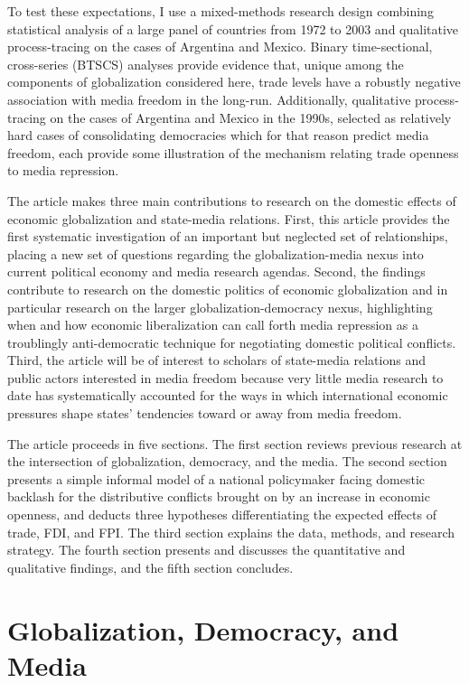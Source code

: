 \documentclass[12pt,a4paper]{article}\usepackage[]{graphicx}\usepackage[]{color}
\begin{document}
To test these expectations, I use a mixed-methods research design combining statistical analysis of a large panel of countries from 1972 to 2003 and qualitative process-tracing on the cases of Argentina and Mexico. Binary time-sectional, cross-series (BTSCS) analyses provide evidence that, unique among the components of globalization considered here, trade levels have a robustly negative association with media freedom in the long-run. Additionally, qualitative process-tracing on the cases of Argentina and Mexico in the 1990s, selected as relatively hard cases of consolidating democracies which for that reason predict media freedom, each provide some illustration of the mechanism relating trade openness to media repression.

The article makes three main contributions to research on the domestic effects of economic globalization and state-media relations. First, this article provides the first systematic investigation of an important but neglected set of relationships, placing a new set of questions regarding the globalization-media nexus into current political economy and media research agendas. Second, the findings contribute to research on the domestic politics of economic globalization and in particular research on the larger globalization-democracy nexus, highlighting when and how economic liberalization can call forth media repression as a troublingly anti-democratic technique for negotiating domestic political conflicts. Third, the article will be of interest to scholars of state-media relations and public actors interested in media freedom because very little media research to date has systematically accounted for the ways in which international economic pressures shape states' tendencies toward or away from media freedom.

The article proceeds in five sections. The first section reviews previous research at the intersection of globalization, democracy, and the media. The second section presents a simple informal model of a national policymaker facing domestic backlash for the distributive conflicts brought on by an increase in economic openness, and deducts three hypotheses differentiating the expected effects of trade, FDI, and FPI. The third section explains the data, methods, and research strategy. The fourth section presents and discusses the quantitative and qualitative findings, and the fifth section concludes.

\section{Globalization, Democracy, and Media}
\end{document}
